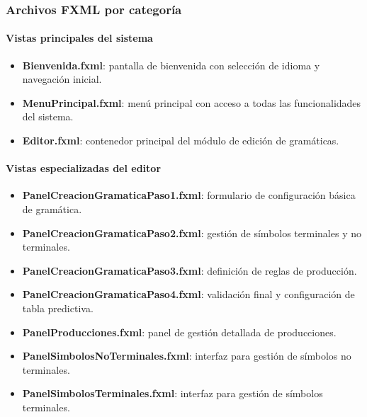 \subsubsection{Archivos FXML por categoría}

\paragraph{Vistas principales del sistema}
\begin{itemize}
    \item \textbf{Bienvenida.fxml}: pantalla de bienvenida con selección de idioma y navegación inicial.
    \item \textbf{MenuPrincipal.fxml}: menú principal con acceso a todas las funcionalidades del sistema.
    \item \textbf{Editor.fxml}: contenedor principal del módulo de edición de gramáticas.
\end{itemize}

\paragraph{Vistas especializadas del editor}
\begin{itemize}
    \item \textbf{PanelCreacionGramaticaPaso1.fxml}: formulario de configuración básica de gramática.
    \item \textbf{PanelCreacionGramaticaPaso2.fxml}: gestión de símbolos terminales y no terminales.
    \item \textbf{PanelCreacionGramaticaPaso3.fxml}: definición de reglas de producción.
    \item \textbf{PanelCreacionGramaticaPaso4.fxml}: validación final y configuración de tabla predictiva.
    \item \textbf{PanelProducciones.fxml}: panel de gestión detallada de producciones.
    \item \textbf{PanelSimbolosNoTerminales.fxml}: interfaz para gestión de símbolos no terminales.
    \item \textbf{PanelSimbolosTerminales.fxml}: interfaz para gestión de símbolos terminales.
\end{itemize}

